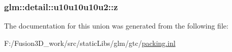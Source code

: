 \subsubsection[{z}]{ glm\+::detail\+::u10u10u10u2\+::z}\label{unionglm_1_1detail_1_1u10u10u10u2_a8c4c851343129c55d86d6b0b7aed9b4f}


The documentation for this union was generated from the following file\+:\begin{DoxyCompactItemize}
\item 
F\+:/\+Fusion3\+D\+\_\+work/src/static\+Libs/glm/gtc/\hyperlink{packing_8inl}{packing.\+inl}\end{DoxyCompactItemize}
